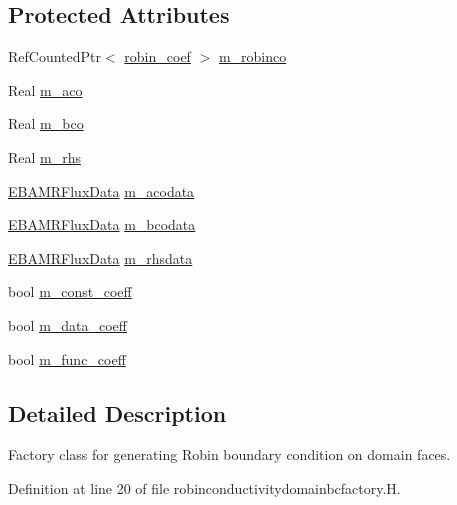 \subsection*{Protected Attributes}
\begin{DoxyCompactItemize}
\item 
Ref\+Counted\+Ptr$<$ \hyperlink{classrobin__coef}{robin\+\_\+coef} $>$ \hyperlink{classrobinconductivitydomainbcfactory_a0bd3387a00dd879229bcb789819fb603}{m\+\_\+robinco}
\item 
Real \hyperlink{classrobinconductivitydomainbcfactory_aacc80154b5af65a8e1e9fdf6f07f5cea}{m\+\_\+aco}
\item 
Real \hyperlink{classrobinconductivitydomainbcfactory_a81137da36f4e96fa2601e6def280edd8}{m\+\_\+bco}
\item 
Real \hyperlink{classrobinconductivitydomainbcfactory_a078909aca7ef8f1a4986f72a4dc563a1}{m\+\_\+rhs}
\item 
\hyperlink{type__definitions_8H_aadad278b2e5d3d4abcf9032f90ba78c3}{E\+B\+A\+M\+R\+Flux\+Data} \hyperlink{classrobinconductivitydomainbcfactory_a2d2a38f37f8377cc9c367f2bfb5ff550}{m\+\_\+acodata}
\item 
\hyperlink{type__definitions_8H_aadad278b2e5d3d4abcf9032f90ba78c3}{E\+B\+A\+M\+R\+Flux\+Data} \hyperlink{classrobinconductivitydomainbcfactory_a7f2db134e4a779c600b1ec35b53c737d}{m\+\_\+bcodata}
\item 
\hyperlink{type__definitions_8H_aadad278b2e5d3d4abcf9032f90ba78c3}{E\+B\+A\+M\+R\+Flux\+Data} \hyperlink{classrobinconductivitydomainbcfactory_a15254f11bce4b7c30bfa87b7f7780398}{m\+\_\+rhsdata}
\item 
bool \hyperlink{classrobinconductivitydomainbcfactory_a50b3b3a13cbdbdfe03c2c44f07b7df87}{m\+\_\+const\+\_\+coeff}
\item 
bool \hyperlink{classrobinconductivitydomainbcfactory_ae0835d3eec0cc52e2f4937f80dd2d7df}{m\+\_\+data\+\_\+coeff}
\item 
bool \hyperlink{classrobinconductivitydomainbcfactory_a12f7cf84405d4b2e63cb196512d192cf}{m\+\_\+func\+\_\+coeff}
\end{DoxyCompactItemize}


\subsection{Detailed Description}
Factory class for generating Robin boundary condition on domain faces. 

Definition at line 20 of file robinconductivitydomainbcfactory.\+H.



